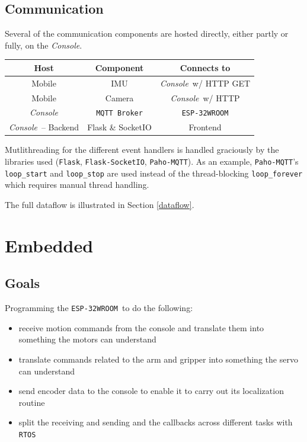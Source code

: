 \documentclass[a4paper,12pt]{article}
\newcommand{\esp}{\texttt{ESP-32WROOM}}
\newcommand{\con}{\textit{Console}}
\begin{document}
\subsection{Communication}
Several of the communication components are hosted directly, either partly or fully, on the \con.
\begin{center}
    \bgroup
    \def\arraystretch{1.5}
    {
        \begin{tabular}{|c|c|c|}
            \hline
            \textbf{Host}    & \textbf{Component}   & \textbf{Connects to} \\
            \hline
            Mobile           & IMU                  & \con\ w/ HTTP GET    \\
            \hline
            Mobile           & Camera               & \con\ w/ HTTP        \\
            \hline
            \con             & \texttt{MQTT Broker} & \esp                 \\
            \hline
            \con\ -- Backend & Flask \& SocketIO    & Frontend             \\
            \hline
        \end{tabular}}
    \egroup
\end{center}

Mutlithreading for the different event handlers is handled graciously by the libraries used (\texttt{Flask}, \texttt{Flask-SocketIO}, \texttt{Paho-MQTT}). As an example, \texttt{Paho-MQTT}'s \texttt{loop\_start} and \texttt{loop\_stop} are used instead of the thread-blocking \texttt{loop\_forever} which requires manual thread handling.

The full dataflow is illustrated in Section \ref{dataflow}.

\section{Embedded}
\subsection*{Goals}
Programming the \esp\ to do the following:
\begin{itemize}
    \item receive motion commands from the console and translate them into something the motors can understand
    \item translate commands related to the arm and gripper into something the servo can understand
    \item send encoder data to the console to enable it to carry out its localization routine
    \item split the receiving and sending and the callbacks across different tasks with \texttt{RTOS}
\end{itemize}
\end{document}
